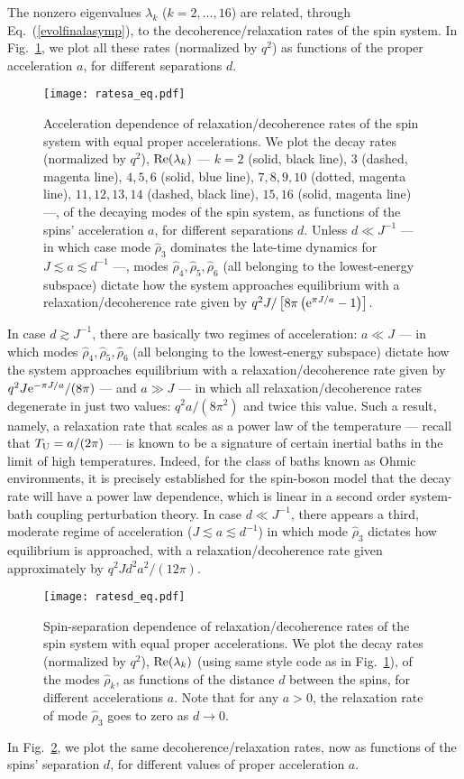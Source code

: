 \documentclass[]{nature}
\makeatletter
\renewenvironment{figure*}
               {\@dblfloat{figure}}
               {\end@dblfloat}
\makeatother
\begin{document}
{The nonzero eigenvalues $\lambda_k$ ($k=2,\dots,16$) are related, through
Eq.~(\ref{evolfinalasymp}), to the decoherence/relaxation rates of the spin system. In Fig.~\ref{ratesd}, we plot all  these rates (normalized by $q^2$) as functions of the proper acceleration $a$,
for different separations $d$.
\begin{figure*}
 \texttt{[image: ratesa\_eq.pdf]}
\caption{Acceleration dependence of relaxation/decoherence rates of the spin system with equal proper accelerations.
We plot the decay rates (normalized by $q^2$),  ${\rm Re}(\lambda_k)$ --- $k = 2$ (solid, black line), $ 3$ (dashed, magenta line),
$4,5,6$ (solid, blue line),
$7,8,9,10$ (dotted, magenta line), $11,12,13,14$ (dashed, black line), $15,16$ 
(solid, magenta line)
---, of the decaying modes of the spin system,
as functions of the spins' acceleration $a$, for different separations $d$. 
 Unless $d\ll J^{-1}$ --- in which case mode
$\hat\rho_3$ dominates the late-time dynamics for $J \lesssim a \lesssim d^{-1}$ ---, modes $\hat\rho_4,\hat\rho_5,\hat\rho_6$  (all
belonging to the lowest-energy subspace)
dictate
how the system approaches equilibrium with a relaxation/decoherence rate 
given by $q^2 J/\left[8\pi \left({\rm e}^{\pi J/a}-1\right)\right]$.}
\label{ratesd}
\end{figure*}
In case $d \gtrsim J^{-1}$, there are basically two regimes of acceleration: $a\ll J$ --- in which modes 
$\hat\rho_4,\hat\rho_5,\hat\rho_6$  (all
belonging to the lowest-energy subspace)
dictate
how the system approaches equilibrium with a relaxation/decoherence rate 
given by $q^2 J{\rm e}^{-\pi J/a}/(8\pi)$ --- and $a\gg J$ --- in which all relaxation/decoherence rates
degenerate in just two values: $q^2 a/(8\pi^2)$ and twice this value. Such a result, namely, a relaxation rate that scales as a power law of the temperature --- recall that $T_{\rm U} = a/(2\pi)$ --- 
is known to be a signature of certain inertial baths in the limit of high temperatures. Indeed, for the class of baths known as Ohmic environments, it is precisely established for the spin-boson model that the decay rate will have a power law dependence, which is linear in a second order system-bath coupling perturbation theory\cite{leggett}.
In case $d \ll J^{-1}$, there appears a third, moderate regime of acceleration ($J\lesssim a \lesssim d^{-1}$)
in which mode $\hat\rho_3$ dictates how equilibrium is approached, with a relaxation/decoherence rate given approximately by
$q^2 J d^2 a^2/(12 \pi)$.
\begin{figure*}
 \texttt{[image: ratesd\_eq.pdf]}
\caption{Spin-separation dependence 
of relaxation/decoherence rates of the spin system with equal proper accelerations.
We plot the decay rates (normalized by $q^2$),  ${\rm Re}(\lambda_k)$ (using same style code as in Fig.~\ref{ratesd}),
of the modes $\hat\rho_k$,
as functions of the distance  $d$ between the spins, for different accelerations $a$. 
 Note that for any $a>0$, the relaxation rate of mode $\hat \rho_3$ goes to zero as $d\to 0$.}
\label{ratesa}
\end{figure*}
In Fig.~\ref{ratesa}, we plot the same decoherence/relaxation rates, now as functions of the spins' separation
$d$, for different values of proper acceleration $a$.

}
\end{document}
